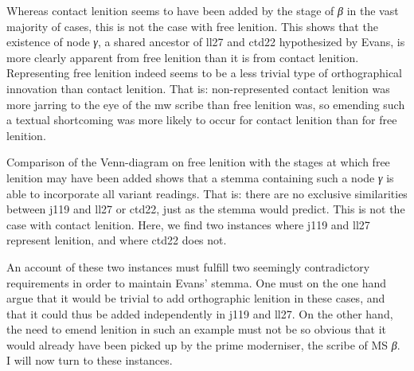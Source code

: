 Whereas contact lenition seems to have been added by the stage of \textit{β} in the vast majority of cases, this is not the case with free lenition. This shows that the existence of node \textit{γ}, a shared ancestor of \gls{ll27} and \gls{ctd22} hypothesized by Evans, is more clearly apparent from free lenition than it is from contact lenition. Representing free lenition indeed seems to be a less trivial type of orthographical innovation than contact lenition. That is: non-represented contact lenition was more jarring to the eye of the \gls{mw} scribe than free lenition was, so emending such a textual shortcoming was more likely to occur for contact lenition than for free lenition.

Comparison of the Venn-diagram on free lenition with the stages at which free lenition may have been added shows that a stemma containing such a node \textit{γ} is able to incorporate all variant readings. That is: there are no exclusive similarities between \gls{j119} and \gls{ll27} or \gls{ctd22}, just as the stemma would predict. This is not the case with contact lenition. Here, we find two instances where \gls{j119} and \gls{ll27} represent lenition, and where \gls{ctd22} does not.

An account of these two instances must fulfill two seemingly contradictory requirements in order to maintain Evans' stemma. One must on the one hand argue that it would be trivial to add orthographic lenition in these cases, and that it could thus be added independently in \gls{j119} and \gls{ll27}. On the other hand, the need to emend lenition in such an example must not be so obvious that it would already have been picked up by the prime moderniser, the scribe of MS \textit{β}. I will now turn to these instances. 

